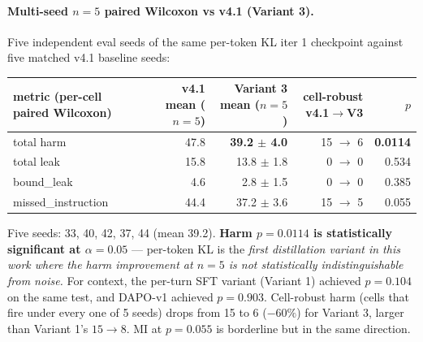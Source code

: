 \documentclass[11pt]{article}
\begin{document}
\paragraph{Multi-seed $n{=}5$ paired Wilcoxon vs v4.1 (Variant 3).} Five independent eval seeds of the same per-token KL iter 1 checkpoint against five matched v4.1 baseline seeds:
\begin{center}\small
\begin{tabular}{l r r r r}
\toprule
metric (per-cell paired Wilcoxon)         & v4.1 mean ($n{=}5$)  & Variant 3 mean ($n{=}5$)        & cell-robust v4.1$\rightarrow$V3       & $p$ \\
\midrule
total harm                                & 47.8                 & \textbf{39.2 $\pm$ 4.0}          & 15 $\rightarrow$ 6                    & \textbf{0.0114} \\
total leak                                & 15.8                 & 13.8 $\pm$ 1.8                    & 0  $\rightarrow$ 0                    & 0.534 \\
bound\_leak                               & 4.6                  & 2.8 $\pm$ 1.5                     & 0  $\rightarrow$ 0                    & 0.385 \\
missed\_instruction                       & 44.4                 & 37.2 $\pm$ 3.6                    & 15 $\rightarrow$ 5                    & 0.055 \\
\bottomrule
\end{tabular}
\end{center}

Five seeds: 33, 40, 42, 37, 44 (mean 39.2). \textbf{Harm $p = 0.0114$ is statistically significant at $\alpha = 0.05$} --- per-token KL is the \emph{first distillation variant in this work where the harm improvement at $n{=}5$ is not statistically indistinguishable from noise.} For context, the per-turn SFT variant (Variant 1) achieved $p = 0.104$ on the same test, and DAPO-v1 achieved $p = 0.903$. Cell-robust harm (cells that fire under every one of 5 seeds) drops from 15 to 6 ($-60\%$) for Variant 3, larger than Variant 1's $15 \rightarrow 8$. MI at $p = 0.055$ is borderline but in the same direction.
\end{document}
